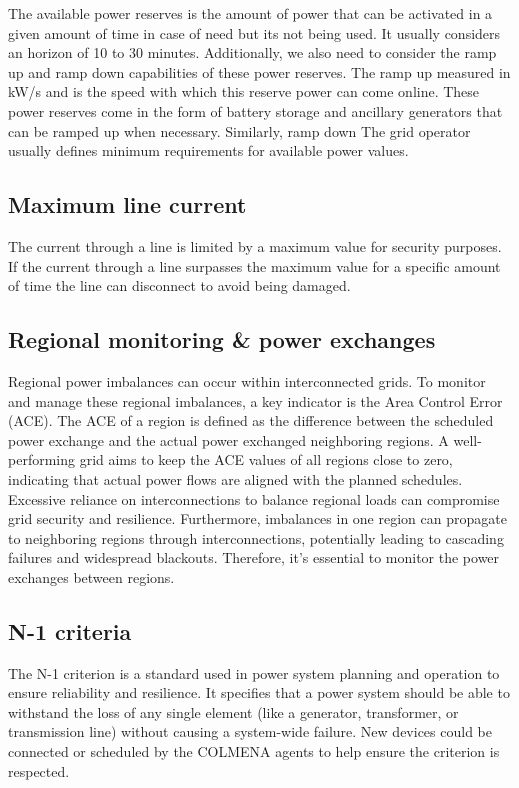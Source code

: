 \documentclass{article}
\begin{document}
The available power reserves is the amount of power that can be activated in a given amount of time in case of need but its not being used. It usually considers an horizon of 10 to 30 minutes. Additionally, we also need to consider the ramp up and ramp down capabilities of these power reserves. The ramp up measured in kW/s and is the speed with which this reserve power can come online. These power reserves come in the form of battery storage and ancillary generators that can be ramped up when necessary. Similarly, ramp down The grid operator usually defines minimum requirements for available power values.


\subsection*{Maximum line current}

The current through a line is limited by a maximum value for security purposes. If the current through a line surpasses the maximum value for a specific amount of time the line can disconnect to avoid being damaged.

\subsection*{Regional monitoring \& power exchanges}

Regional power imbalances can occur within interconnected grids.
To monitor and manage these regional imbalances, a key indicator is the Area Control Error (ACE). The ACE of a region is defined as the difference between the scheduled power exchange and the actual power exchanged neighboring regions. A well-performing grid aims to keep the ACE values of all regions close to zero, indicating that actual power flows are aligned with the planned schedules. Excessive reliance on interconnections to balance regional loads can compromise grid security and resilience. Furthermore, imbalances in one region can propagate to neighboring regions through interconnections, potentially leading to cascading failures and widespread blackouts. Therefore, it's essential to monitor the power exchanges between regions.

\subsection*{N-1 criteria}

The N-1 criterion is a standard used in power system planning and operation to ensure reliability and resilience. It specifies that a power system should be able to withstand the loss of any single element (like a generator, transformer, or transmission line) without causing a system-wide failure. New devices could be connected or scheduled by the COLMENA agents to help ensure the criterion is respected. 
\end{document}
